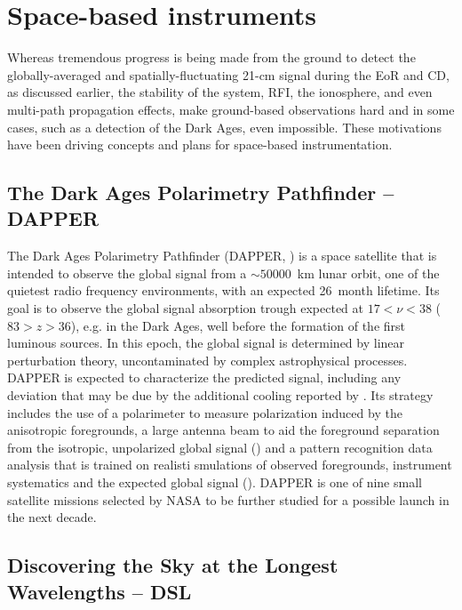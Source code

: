 \section{Space-based instruments}
\label{sec:space_base_instruments}

Whereas tremendous progress is being made from the ground to detect the globally-averaged and spatially-fluctuating 21-cm signal during the EoR and CD, as discussed earlier, the stability of the system, RFI, the ionosphere, and even multi-path propagation effects, make ground-based observations hard and in some cases, such as a detection of the Dark Ages, even impossible. These motivations have been driving concepts and plans for space-based instrumentation. 

\subsection{The Dark Ages Polarimetry Pathfinder -- DAPPER}

The Dark Ages Polarimetry Pathfinder (DAPPER, \cite{burns19}) is a space satellite that is intended to observe the global signal from a $\sim 50000$~km lunar orbit, one of the quietest radio frequency environments, with an expected 26~month lifetime. Its goal is to observe the global signal absorption trough expected at $17 < \nu < 38$ ($83 > z > 36$), e.g. in the Dark Ages, well before the formation of the first luminous sources. In this epoch, the global signal is determined by linear perturbation theory, uncontaminated by complex astrophysical processes. DAPPER is expected to characterize the predicted signal, including any deviation that may be due by the additional cooling reported by \cite{bowman18}. Its strategy includes the use of a polarimeter to measure polarization induced by the anisotropic foregrounds, a large antenna beam to aid the foreground separation from the isotropic, unpolarized global signal (\cite{nhan17}) and a pattern recognition data analysis that is trained on realisti smulations of observed foregrounds, instrument systematics and the expected global signal (\cite{tauscher18}).
%
DAPPER is one of nine small satellite missions selected by NASA to be further studied for a possible launch in the next decade.



\subsection{Discovering the Sky at the Longest Wavelengths -- DSL}


